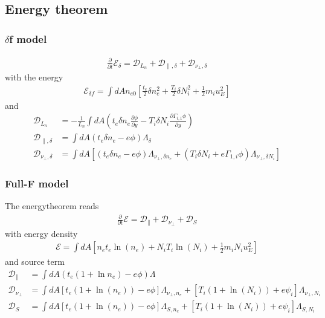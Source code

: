 \subsection{Energy theorem}
\subsubsection{\(\delta\)f model}
\begin{eqnarray}
 \frac{\partial}{\partial t}  \mathcal{E}_{\delta } = \mathcal{D}_{L_n}+ \mathcal{D}_{\parallel,\delta } + \mathcal{D}_{\nu_\perp,\delta }
\end{eqnarray}
with the energy
\begin{eqnarray}
 \mathcal{E}_{\delta f} =  \int dA n_{e0}\left[\frac{t_e}{2} \delta{n}_e^2  +  \frac{T_i}{2} \delta{N}_i^2    + \frac{1}{2} m_i  u_E^2\right]
\end{eqnarray}
and 
\begin{align}
 \mathcal{D}_{L_n}                  &= - \frac{1}{L_n}\int dA \left( t_e \delta{n}_e \frac{\partial \phi }{\partial y}  - T_i \delta{N}_i \frac{\partial \Gamma_{i,1} \phi }{\partial y} \right) \\
\mathcal{D}_{\parallel,\delta } &=  \int dA \left(t_e \delta{n}_e - e \phi \right) \Lambda_\delta \\
\mathcal{D}_{\nu_\perp,\delta } &=  \int dA \left[ \left(t_e \delta{n}_e - e \phi \right) \Lambda_{\nu_\perp,\delta n_e} +  \left(T_i \delta{N}_i + e \Gamma_{1,i} \phi \right) \Lambda_{\nu_\perp,\delta N_i}\right]
\end{align}

\subsubsection{Full-F model}
The energytheorem reads
\begin{eqnarray}
 \frac{\partial}{\partial t}  \mathcal{E} = \mathcal{D}_\parallel + \mathcal{D}_{\nu_\perp} + \mathcal{D}_{S}
\end{eqnarray}
with energy density
\begin{eqnarray}
 \mathcal{E} = \int dA \left[ n_e t_e   \ln{\left(n_e\right)} + N_i T_i   \ln{\left(N_i\right)}+ \frac{1}{2} m_i N_i u_E^2\right]
\end{eqnarray}
and source term
\begin{align}
\mathcal{D}_\parallel  &= \int dA \left(t_e \left(1+\ln{n_e}\right) -e \phi\right)  \Lambda \\
\mathcal{D}_{\nu_\perp} &= \int dA \left[t_{e} (1+\ln (n_e))  - e \phi \right]\Lambda_{\nu_\perp,n_e} +\left[T_{i}  (1+\ln (N_i))+ e \psi_i \right] \Lambda_{\nu_\perp,N_i} \\
\mathcal{D}_{S} &= \int dA \left[t_{e} (1+\ln (n_e))  - e \phi \right]\Lambda_{S,n_e} +\left[T_{i}  (1+\ln (N_i))+ e \psi_i \right] \Lambda_{S,N_i} 
\end{align}

